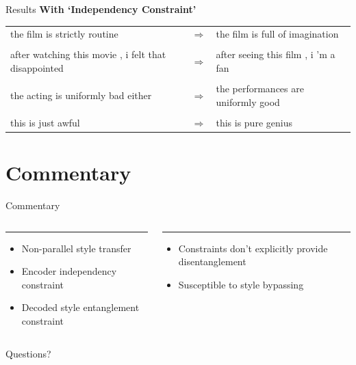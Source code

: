 \documentclass{beamer}
\begin{document}
\begin{frame}{Results}
  \centering
  {\large \textbf{With `Independency Constraint'}} \\
  \vspace{1cm}
  \small
  \begin{tabular}{ p{.4\linewidth} p{.05\linewidth} p{.4\linewidth} }
    the film is strictly routine & $\Rightarrow$ & the film is full of imagination \\  \\
    after watching this movie , i felt that disappointed & $\Rightarrow$ & after seeing this film , i 'm a fan \\  \\
    the acting is uniformly bad either & $\Rightarrow$ & the performances are uniformly good \\  \\
    this is just awful & $\Rightarrow$ & this is pure genius
  \end{tabular}
\end{frame}

\section{Commentary}
\begin{frame}{Commentary}
  \begin{columns}[T] %
    \begin{column}{.48\textwidth}
    \color{tropicalrainforest}\rule{\linewidth}{4pt}
    \begin{itemize}
      \item Non-parallel style transfer
      \item Encoder independency constraint
      \item Decoded style entanglement constraint
    \end{itemize}
    \end{column}
    \hfill
    \begin{column}{.48\textwidth}
    \color{usccardinal}\rule{\linewidth}{4pt}
    \begin{itemize}
      \item Constraints don't explicitly provide disentanglement
      \item Susceptible to style bypassing
    \end{itemize}
    \end{column}
  \end{columns}
\end{frame}

\begin{frame}
  \centering
  \Huge{Questions?}
\end{frame}
\end{document}
